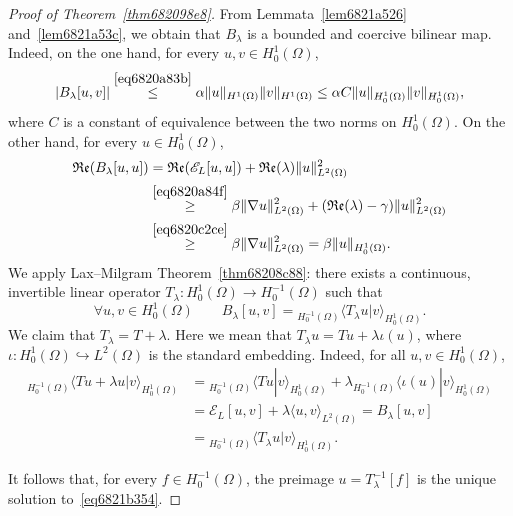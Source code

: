 \documentclass[a4paper,9pt]{amsart}
\newcommand{\scr}[1]{\mathscr{#1}}
\newcommand{\frk}[1]{\mathfrak{#1}}
\newcommand{\into}{\hookrightarrow}		%
\newcommand{\real}{\frk{Re}}
\newcommand{\grad}{\nabla}
\theoremstyle{plain}
\theoremstyle{definition}
\theoremstyle{remark}
\begin{document}
\begin{proof}[Proof of Theorem~\ref{thm682098e8}]
	From Lemmata~\ref{lem6821a526} and~\ref{lem6821a53c}, we obtain that $B_\lambda$ is a bounded and coercive bilinear map.
	Indeed,
	on the one hand, for every $u,v\in H^1_0(\Omega)$,
	\begin{equation}
		|B_\lambda[u,v]| \overset{\eqref{eq6820a83b}}\le \alpha \|u\|_{H^1(\Omega)} \|v\|_{H^1(\Omega)} 
		\le \alpha C \|u\|_{H^1_0(\Omega)} \|v\|_{H^1_0(\Omega)} ,
	\end{equation}
	where $C$ is a constant of equivalence between the two norms on $H^1_0(\Omega)$.
	On the other hand, for every $u\in H^1_0(\Omega)$,
	\begin{align}
		\real(B_\lambda[u,u])
		&=  \real(\scr E_L[u,u]) + \real(\lambda) \|u\|_{L^2(\Omega)}^2 \\
		&\overset{\eqref{eq6820a84f}}\ge \beta \|\grad u\|_{L^2(\Omega)}^2 + (\real(\lambda)- \gamma) \|u\|_{L^2(\Omega)}^2 \\
		&\overset{\eqref{eq6820c2ce}}\ge \beta \|\grad u\|_{L^2(\Omega)}^2 
		= \beta \|u\|_{H^1_0(\Omega)} .
	\end{align}
	We apply Lax--Milgram Theorem~\ref{thm68208c88}:
	there exists a continuous, invertible linear operator $T_\lambda:H^1_0(\Omega)\to H^{-1}_0(\Omega)$ such that
	\begin{equation}
		\forall u,v\in H^1_0(\Omega)\qquad
		B_\lambda[u,v] = {}_{H^{-1}_0(\Omega)}\langle T_\lambda u | v \rangle_{H^1_0(\Omega)} .
	\end{equation}
	We claim that $T_\lambda = T+\lambda$.
	Here we mean that $T_\lambda u = Tu + \lambda \iota(u)$, where $\iota: H^1_0(\Omega)\into L^2(\Omega)$ is the standard embedding.
	Indeed, for all $u,v\in H^1_0(\Omega)$,
	\begin{align}
		{}_{H^{-1}_0(\Omega)}\langle Tu + \lambda u | v \rangle_{H^1_0(\Omega)}
		&= {}_{H^{-1}_0(\Omega)}\langle Tu  | v \rangle_{H^1_0(\Omega)}
			+ \lambda {}_{H^{-1}_0(\Omega)}\langle \iota(u)| v \rangle_{H^1_0(\Omega)} \\
		&= \scr E_L[u,v] + \lambda \langle u,v \rangle_{L^2(\Omega)} 
		= B_\lambda[u,v] \\
		&= {}_{H^{-1}_0(\Omega)}\langle T_\lambda u | v \rangle_{H^1_0(\Omega)} .
	\end{align}
	
	It follows that, for every $f\in H^{-1}_0(\Omega)$, the preimage $u=T_\lambda^{-1}[f]$ is the unique solution to~\eqref{eq6821b354}.
	

\end{proof}
\end{document}
